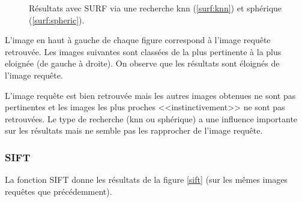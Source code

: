 \documentclass[a4paper]{article}
\begin{document}
\begin{figure}[!ht]%
  \centering
  \hspace{0.01\textwidth}
  \caption{Résultats avec SURF via une recherche knn (\ref{surf:knn}) et sphérique (\ref{surf:spheric}).}
  \label{surf}
\end{figure}

L'image en haut à gauche de chaque figure correspond à l'image requête retrouvée. Les images suivantes sont
classées de la plus pertinente à la plus eloignée (de gauche à droite).
On observe que les résultats sont éloignés de l'image requête. 

L'image requête est bien retrouvée mais les autres images obtenues ne sont pas pertinentes et les images les
plus proches <<instinctivement>> ne sont pas retrouvées. 
Le type de recherche (knn ou sphérique) a une influence importante sur les résultats mais ne semble pas les rapprocher de l'image requête. 

\subsubsection{SIFT}

La fonction SIFT donne les résultats de la figure \ref{sift} (sur les mêmes images requêtes que précédemment).
\end{document}
